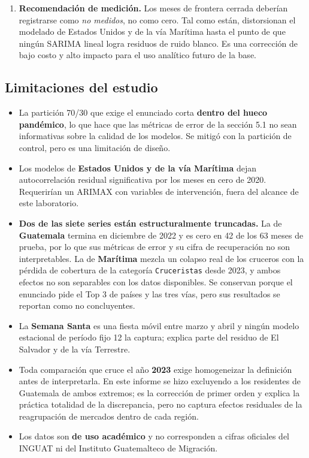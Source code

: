 \documentclass[12pt,letterpaper]{article}
\newcommand{\subseccion}[1]{\subsection{#1}}
\begin{document}
\begin{enumerate}[leftmargin=1.6em,itemsep=6pt]
\item \textbf{Recomendación de medición.} Los meses de frontera cerrada deberían registrarse
como \textit{no medidos}, no como cero. Tal como están, distorsionan el modelado de Estados
Unidos y de la vía Marítima hasta el punto de que ningún SARIMA lineal logra residuos de ruido
blanco. Es una corrección de bajo costo y alto impacto para el uso analítico futuro de la base.

\end{enumerate}

\subseccion{Limitaciones del estudio}

\begin{itemize}[leftmargin=1.4em,itemsep=3pt]
  \item La partición 70/30 que exige el enunciado corta \textbf{dentro del hueco pandémico}, lo
  que hace que las métricas de error de la sección 5.1 no sean informativas sobre la calidad de
  los modelos. Se mitigó con la partición de control, pero es una limitación de diseño.
  \item Los modelos de \textbf{Estados Unidos y de la vía Marítima} dejan autocorrelación
  residual significativa por los meses en cero de 2020. Requerirían un ARIMAX con variables de
  intervención, fuera del alcance de este laboratorio.
  \item \textbf{Dos de las siete series están estructuralmente truncadas.} La de
  \textbf{Guatemala} termina en diciembre de 2022 y es cero en 42 de los 63 meses de prueba, por
  lo que sus métricas de error y su cifra de recuperación no son interpretables. La de
  \textbf{Marítima} mezcla un colapso real de los cruceros con la pérdida de cobertura de la
  categoría \texttt{Cruceristas} desde 2023, y ambos efectos no son separables con los datos
  disponibles. Se conservan porque el enunciado pide el Top 3 de países y las tres vías, pero
  sus resultados se reportan como no concluyentes.
  \item La \textbf{Semana Santa} es una fiesta móvil entre marzo y abril y ningún modelo
  estacional de período fijo 12 la captura; explica parte del residuo de El Salvador y de la
  vía Terrestre.
  \item Toda comparación que cruce el año \textbf{2023} exige homogeneizar la definición antes
  de interpretarla. En este informe se hizo excluyendo a los residentes de Guatemala de ambos
  extremos; es la corrección de primer orden y explica la práctica totalidad de la discrepancia,
  pero no captura efectos residuales de la reagrupación de mercados dentro de cada región.
  \item Los datos son \textbf{de uso académico} y no corresponden a cifras oficiales del INGUAT
  ni del Instituto Guatemalteco de Migración.
\end{itemize}
\end{document}
